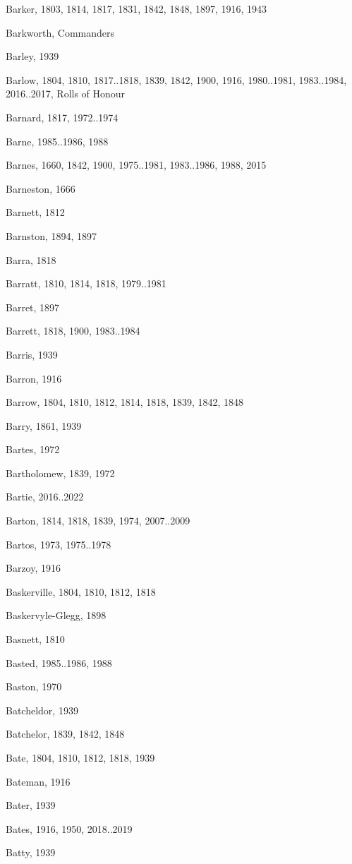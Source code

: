 \begin{theindex}
\item Barker, 1803, 1814, 1817, 1831, 1842, 1848, 1897, 1916, 1943
\item Barkworth, Commanders
\item Barley, 1939
\item Barlow, 1804, 1810, 1817..1818, 1839, 1842, 1900, 1916, 1980..1981, 1983..1984, 2016..2017, Rolls of Honour
\item Barnard, 1817, 1972..1974
\item Barne, 1985..1986, 1988
\item Barnes, 1660, 1842, 1900, 1975..1981, 1983..1986, 1988, 2015
\item Barneston, 1666
\item Barnett, 1812
\item Barnston, 1894, 1897
\item Barra, 1818
\item Barratt, 1810, 1814, 1818, 1979..1981
\item Barret, 1897
\item Barrett, 1818, 1900, 1983..1984
\item Barris, 1939
\item Barron, 1916
\item Barrow, 1804, 1810, 1812, 1814, 1818, 1839, 1842, 1848
\item Barry, 1861, 1939
\item Bartes, 1972
\item Bartholomew, 1839, 1972
\item Bartie, 2016..2022
\item Barton, 1814, 1818, 1839, 1974, 2007..2009
\item Bartos, 1973, 1975..1978
\item Barzoy, 1916
\item Baskerville, 1804, 1810, 1812, 1818
\item Baskervyle-Glegg, 1898
\item Basnett, 1810
\item Basted, 1985..1986, 1988
\item Baston, 1970
\item Batcheldor, 1939
\item Batchelor, 1839, 1842, 1848
\item Bate, 1804, 1810, 1812, 1818, 1939
\item Bateman, 1916
\item Bater, 1939
\item Bates, 1916, 1950, 2018..2019
\item Batty, 1939

\end{theindex}
